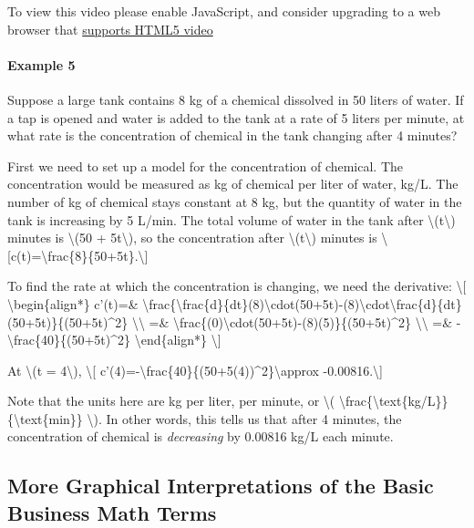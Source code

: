 To view this video please enable JavaScript, and consider upgrading to a
web browser that \href{http://videojs.com/html5-video-support/}{supports
HTML5 video}

\hypertarget{example-5}{%
\paragraph{Example 5}\label{example-5}}

Suppose a large tank contains 8 kg of a chemical dissolved in 50 liters
of water. If a tap is opened and water is added to the tank at a rate of
5 liters per minute, at what rate is the concentration of chemical in
the tank changing after 4 minutes?

First we need to set up a model for the concentration of chemical. The
concentration would be measured as kg of chemical per liter of water,
kg/L. The number of kg of chemical stays constant at 8 kg, but the
quantity of water in the tank is increasing by 5 L/min. The total volume
of water in the tank after \textbackslash{}(t\textbackslash{}) minutes
is \textbackslash{}(50 + 5t\textbackslash{}), so the concentration after
\textbackslash{}(t\textbackslash{}) minutes is
\textbackslash{}{[}c(t)=\textbackslash{}frac\{8\}\{50+5t\}.\textbackslash{}{]}

To find the rate at which the concentration is changing, we need the
derivative: \textbackslash{}{[} \textbackslash{}begin\{align*\} c'(t)=\&
\textbackslash{}frac\{\textbackslash{}frac\{d\}\{dt\}(8)\textbackslash{}cdot(50+5t)-(8)\textbackslash{}cdot\textbackslash{}frac\{d\}\{dt\}(50+5t)\}\{(50+5t)\^{}2\}
\textbackslash{}\textbackslash{} =\&
\textbackslash{}frac\{(0)\textbackslash{}cdot(50+5t)-(8)(5)\}\{(50+5t)\^{}2\}
\textbackslash{}\textbackslash{} =\&
-\textbackslash{}frac\{40\}\{(50+5t)\^{}2\}
\textbackslash{}end\{align*\} \textbackslash{}{]}

At \textbackslash{}(t = 4\textbackslash{}), \textbackslash{}{[}
c'(4)=-\textbackslash{}frac\{40\}\{(50+5(4))\^{}2\}\textbackslash{}approx
-0.00816.\textbackslash{}{]}

Note that the units here are kg per liter, per minute, or
\textbackslash{}(
\textbackslash{}frac\{\textbackslash{}text\{kg/L\}\}\{\textbackslash{}text\{min\}\}
\textbackslash{}). In other words, this tells us that after 4 minutes,
the concentration of chemical is \emph{decreasing} by 0.00816 kg/L each
minute.

\hypertarget{more-graphical-interpretations-of-the-basic-business-math-terms}{%
\subsection{More Graphical Interpretations of the Basic Business Math
Terms}\label{more-graphical-interpretations-of-the-basic-business-math-terms}}

